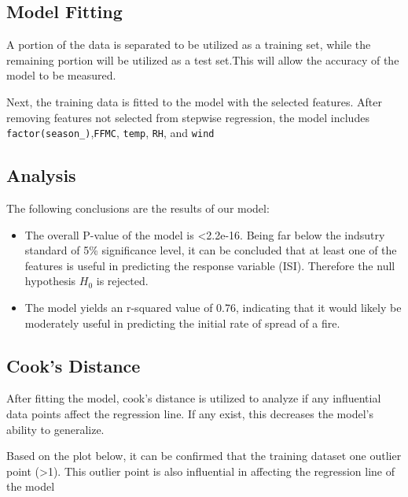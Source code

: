 \documentclass[conference,final,]{IEEEtran}
\begin{document}
\hypertarget{model-fitting}{%
\subsection{Model Fitting}\label{model-fitting}}

A portion of the data is separated to be utilized as a training set,
while the remaining portion will be utilized as a test set.This will
allow the accuracy of the model to be measured.

Next, the training data is fitted to the model with the selected
features. After removing features not selected from stepwise regression,
the model includes \texttt{factor(season\_)},\texttt{FFMC},
\texttt{temp}, \texttt{RH}, and \texttt{wind}

\hypertarget{analysis}{%
\subsection{Analysis}\label{analysis}}

The following conclusions are the results of our model:

\begin{itemize}
\item
  The overall P-value of the model is \textless{}2.2e-16. Being far
  below the indsutry standard of 5\% significance level, it can be
  concluded that at least one of the features is useful in predicting
  the response variable (ISI). Therefore the null hypothesis \(H_{0}\)
  is rejected.
\item
  The model yields an r-squared value of 0.76, indicating that it would
  likely be moderately useful in predicting the initial rate of spread
  of a fire.
\end{itemize}

\hypertarget{cooks-distance}{%
\subsection{Cook's Distance}\label{cooks-distance}}

After fitting the model, cook's distance is utilized to analyze if any
influential data points affect the regression line. If any exist, this
decreases the model's ability to generalize.

Based on the plot below, it can be confirmed that the training dataset
one outlier point (\textgreater{}1). This outlier point is also
influential in affecting the regression line of the model
\end{document}

